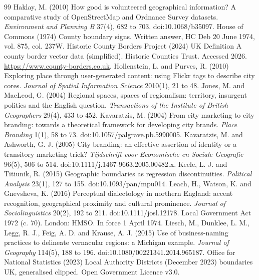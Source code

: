 \documentclass[11pt,a4paper]{article}
\begin{document}
\begin{thebibliography}{99}
 Haklay, M. (2010) How good is volunteered geographical information? A comparative study of OpenStreetMap and Ordnance Survey datasets. \textit{Environment and Planning B} 37(4), 682 to 703. doi:10.1068/b35097.
 House of Commons (1974) County boundary signs. Written answer, HC Deb 20 June 1974, vol. 875, col. 237W.
 Historic County Borders Project (2024) UK Definition A county border vector data (simplified). Historic Counties Trust. Accessed 2026. \url{https://www.county-borders.co.uk}.
 Hollenstein, L. and Purves, R. (2010) Exploring place through user-generated content: using Flickr tags to describe city cores. \textit{Journal of Spatial Information Science} 2010(1), 21 to 48.
 Jones, M. and MacLeod, G. (2004) Regional spaces, spaces of regionalism: territory, insurgent politics and the English question. \textit{Transactions of the Institute of British Geographers} 29(4), 433 to 452.
 Kavaratzis, M. (2004) From city marketing to city branding: towards a theoretical framework for developing city brands. \textit{Place Branding} 1(1), 58 to 73. doi:10.1057/palgrave.pb.5990005.
 Kavaratzis, M. and Ashworth, G. J. (2005) City branding: an effective assertion of identity or a transitory marketing trick? \textit{Tijdschrift voor Economische en Sociale Geografie} 96(5), 506 to 514. doi:10.1111/j.1467-9663.2005.00482.x.
 Keele, L. J. and Titiunik, R. (2015) Geographic boundaries as regression discontinuities. \textit{Political Analysis} 23(1), 127 to 155. doi:10.1093/pan/mpu014.
 Leach, H., Watson, K. and Gnevsheva, K. (2016) Perceptual dialectology in northern England: accent recognition, geographical proximity and cultural prominence. \textit{Journal of Sociolinguistics} 20(2), 192 to 211. doi:10.1111/josl.12178.
 Local Government Act 1972 (c. 70). London: HMSO. In force 1 April 1974.
 Liesch, M., Dunklee, L. M., Legg, R. J., Feig, A. D. and Krause, A. J. (2015) Use of business-naming practices to delineate vernacular regions: a Michigan example. \textit{Journal of Geography} 114(5), 188 to 196. doi:10.1080/00221341.2014.965187.
 Office for National Statistics (2023) Local Authority Districts (December 2023) boundaries UK, generalised clipped. Open Government Licence v3.0.

\end{thebibliography}
\end{document}
